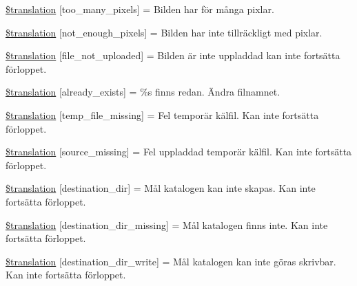 \begin{DoxyCompactItemize}
\item 
\hyperlink{class_8upload_8sv___s_e_8php_aa4051ef64e94a3f8295c63cf85544016}{\$translation} \mbox{[}\textquotesingle{}too\+\_\+many\+\_\+pixels\textquotesingle{}\mbox{]} = \textquotesingle{}Bilden har för många pixlar.\textquotesingle{}
\item 
\hyperlink{class_8upload_8sv___s_e_8php_a1fe342c27ce61f4ff4e0120ba647033e}{\$translation} \mbox{[}\textquotesingle{}not\+\_\+enough\+\_\+pixels\textquotesingle{}\mbox{]} = \textquotesingle{}Bilden har inte tillräckligt med pixlar.\textquotesingle{}
\item 
\hyperlink{class_8upload_8sv___s_e_8php_a4ce76e7be0b3a03c2b47f6d70c21832e}{\$translation} \mbox{[}\textquotesingle{}file\+\_\+not\+\_\+uploaded\textquotesingle{}\mbox{]} = \textquotesingle{}Bilden är inte uppladdad kan inte fortsätta förloppet.\textquotesingle{}
\item 
\hyperlink{class_8upload_8sv___s_e_8php_afd84e910217f04139f567c41e292afa5}{\$translation} \mbox{[}\textquotesingle{}already\+\_\+exists\textquotesingle{}\mbox{]} = \textquotesingle{}\%s finns redan. Ändra filnamnet.\textquotesingle{}
\item 
\hyperlink{class_8upload_8sv___s_e_8php_ab0fa87a88aba2624004581eed0633325}{\$translation} \mbox{[}\textquotesingle{}temp\+\_\+file\+\_\+missing\textquotesingle{}\mbox{]} = \textquotesingle{}Fel temporär kälfil. Kan inte fortsätta förloppet.\textquotesingle{}
\item 
\hyperlink{class_8upload_8sv___s_e_8php_aceaaf7355acaaf10f0ae60378d03c468}{\$translation} \mbox{[}\textquotesingle{}source\+\_\+missing\textquotesingle{}\mbox{]} = \textquotesingle{}Fel uppladdad temporär kälfil. Kan inte fortsätta förloppet.\textquotesingle{}
\item 
\hyperlink{class_8upload_8sv___s_e_8php_aff2427c72a2598aefa6d58df1dd18b08}{\$translation} \mbox{[}\textquotesingle{}destination\+\_\+dir\textquotesingle{}\mbox{]} = \textquotesingle{}Mål katalogen kan inte skapas. Kan inte fortsätta förloppet.\textquotesingle{}
\item 
\hyperlink{class_8upload_8sv___s_e_8php_a9ef28d3cf09942c6c0a1e77fa09185e8}{\$translation} \mbox{[}\textquotesingle{}destination\+\_\+dir\+\_\+missing\textquotesingle{}\mbox{]} = \textquotesingle{}Mål katalogen finns inte. Kan inte fortsätta förloppet.\textquotesingle{}
\item 
\hyperlink{class_8upload_8sv___s_e_8php_a97608ea194a616db49141a0e6dee900c}{\$translation} \mbox{[}\textquotesingle{}destination\+\_\+dir\+\_\+write\textquotesingle{}\mbox{]} = \textquotesingle{}Mål katalogen kan inte göras skrivbar. Kan inte fortsätta förloppet.\textquotesingle{}

\end{DoxyCompactItemize}
